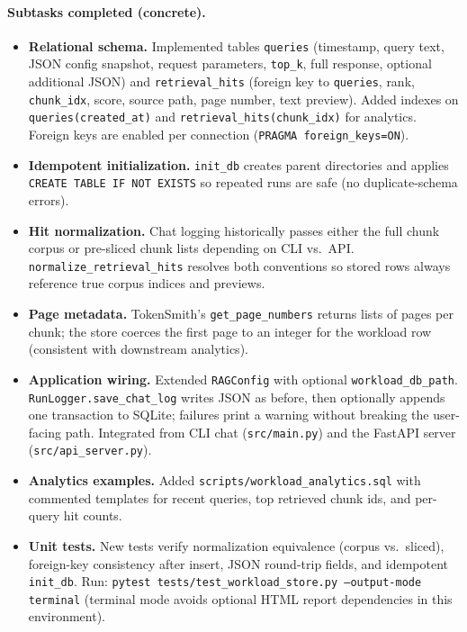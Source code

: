 \documentclass[10pt,twocolumn]{article}
\begin{document}
\paragraph{Subtasks completed (concrete).}
\begin{itemize}
  \item \textbf{Relational schema.} Implemented tables \texttt{queries} (timestamp, query text, JSON config snapshot, request parameters, \texttt{top\_k}, full response, optional additional JSON) and \texttt{retrieval\_hits} (foreign key to \texttt{queries}, rank, \texttt{chunk\_idx}, score, source path, page number, text preview). Added indexes on \texttt{queries(created\_at)} and \texttt{retrieval\_hits(chunk\_idx)} for analytics. Foreign keys are enabled per connection (\texttt{PRAGMA foreign\_keys=ON}).
  \item \textbf{Idempotent initialization.} \texttt{init\_db} creates parent directories and applies \texttt{CREATE TABLE IF NOT EXISTS} so repeated runs are safe (no duplicate-schema errors).
  \item \textbf{Hit normalization.} Chat logging historically passes either the full chunk corpus or pre-sliced chunk lists depending on CLI vs.\ API. \texttt{normalize\_retrieval\_hits} resolves both conventions so stored rows always reference true corpus indices and previews.
  \item \textbf{Page metadata.} TokenSmith's \texttt{get\_page\_numbers} returns lists of pages per chunk; the store coerces the first page to an integer for the workload row (consistent with downstream analytics).
  \item \textbf{Application wiring.} Extended \texttt{RAGConfig} with optional \texttt{workload\_db\_path}. \texttt{RunLogger.save\_chat\_log} writes JSON as before, then optionally appends one transaction to SQLite; failures print a warning without breaking the user-facing path. Integrated from CLI chat (\texttt{src/main.py}) and the FastAPI server (\texttt{src/api\_server.py}).
  \item \textbf{Analytics examples.} Added \texttt{scripts/workload\_analytics.sql} with commented templates for recent queries, top retrieved chunk ids, and per-query hit counts.
  \item \textbf{Unit tests.} New tests verify normalization equivalence (corpus vs.\ sliced), foreign-key consistency after insert, JSON round-trip fields, and idempotent \texttt{init\_db}. Run: \texttt{pytest tests/test\_workload\_store.py --output-mode terminal} (terminal mode avoids optional HTML report dependencies in this environment).
\end{itemize}
\end{document}
